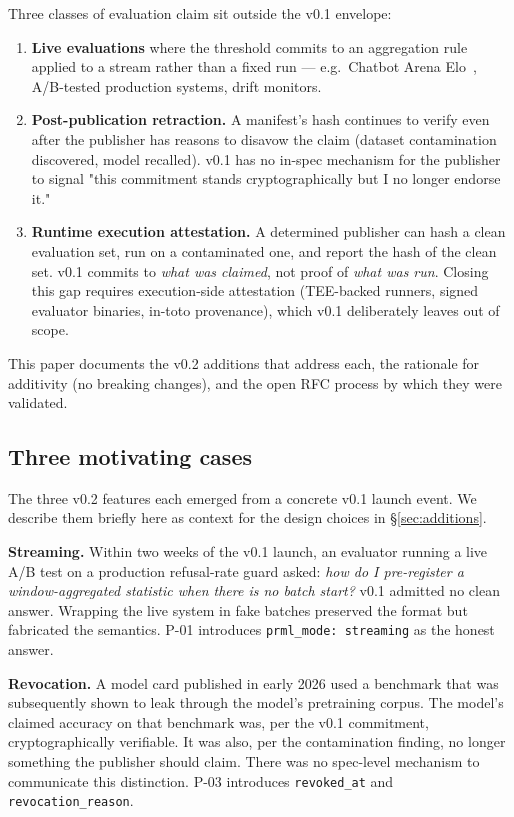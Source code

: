 \documentclass[11pt, a4paper]{article}
\begin{document}
Three classes of evaluation claim sit outside the v0.1 envelope:

\begin{enumerate}[leftmargin=2em]
  \item \textbf{Live evaluations} where the threshold commits to an aggregation rule applied to a stream rather than a fixed run --- e.g.\ Chatbot Arena Elo~\cite{chatbot-arena-2024}, A/B-tested production systems, drift monitors.
  \item \textbf{Post-publication retraction.} A manifest's hash continues to verify even after the publisher has reasons to disavow the claim (dataset contamination discovered, model recalled). v0.1 has no in-spec mechanism for the publisher to signal "this commitment stands cryptographically but I no longer endorse it."
  \item \textbf{Runtime execution attestation.} A determined publisher can hash a clean evaluation set, run on a contaminated one, and report the hash of the clean set. v0.1 commits to \emph{what was claimed}, not proof of \emph{what was run}. Closing this gap requires execution-side attestation (TEE-backed runners, signed evaluator binaries, in-toto provenance), which v0.1 deliberately leaves out of scope.
\end{enumerate}

This paper documents the v0.2 additions that address each, the rationale for additivity (no breaking changes), and the open RFC process by which they were validated.

\subsection{Three motivating cases}

The three v0.2 features each emerged from a concrete v0.1 launch event. We describe them briefly here as context for the design choices in §\ref{sec:additions}.

\textbf{Streaming.} Within two weeks of the v0.1 launch, an evaluator running a live A/B test on a production refusal-rate guard asked: \textit{how do I pre-register a window-aggregated statistic when there is no batch start?} v0.1 admitted no clean answer. Wrapping the live system in fake batches preserved the format but fabricated the semantics. P-01 introduces \texttt{prml\_mode: streaming} as the honest answer.

\textbf{Revocation.} A model card published in early 2026 used a benchmark that was subsequently shown to leak through the model's pretraining corpus. The model's claimed accuracy on that benchmark was, per the v0.1 commitment, cryptographically verifiable. It was also, per the contamination finding, no longer something the publisher should claim. There was no spec-level mechanism to communicate this distinction. P-03 introduces \texttt{revoked\_at} and \texttt{revocation\_reason}.
\end{document}
